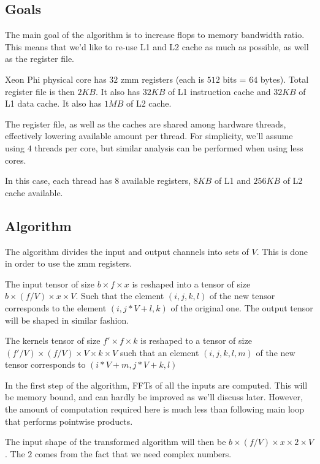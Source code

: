   \subsection{Goals}

  The main goal of the algorithm is to increase flops to memory
  bandwidth ratio.  This means that we'd like to re-use L1 and L2
  cache as much as possible, as well as the register file.

  Xeon Phi physical core has $32$ zmm registers (each is $512$ bits =
  $64$ bytes).  Total register file is then $2KB$.  It also has $32KB$
  of L1 instruction cache and $32KB$ of L1 data cache.  It also has
  $1MB$ of L2 cache.

  The register file, as well as the caches are shared among hardware
  threads, effectively lowering available amount per thread.  For
  simplicity, we'll assume using $4$ threads per core, but similar
  analysis can be performed when using less cores.

  In this case, each thread has $8$ available registers, $8KB$ of L1
  and $256KB$ of L2 cache available.

  \subsection{Algorithm}

  The algorithm divides the input and output channels into sets of
  $V$.  This is done in order to use the zmm registers.

  The input tensor of size $b \times f \times x$ is reshaped into a
  tensor of size $b \times (f / V) \times x \times V$.  Such that the
  element $(i,j,k,l)$ of the new tensor corresponds to the element
  $(i,j*V+l,k)$ of the original one.  The output tensor will be shaped
  in similar fashion.

  The kernels tensor of size $f' \times f \times k$ is reshaped to a
  tensor of size $(f'/V) \times (f / V) \times V \times k \times V$
  such that an element $(i,j,k,l,m)$ of the new tensor corresponds to
  $(i*V+m,j*V+k,l)$

  In the first step of the algorithm, FFTs of all the inputs are
  computed.  This will be memory bound, and can hardly be improved as
  we'll discuss later.  However, the amount of computation required
  here is much less than following main loop that performs pointwise
  products.

  The input shape of the transformed algorithm will then be $b \times
  (f/V) \times x \times 2 \times V$.  The $2$ comes from the fact that
  we need complex numbers.

